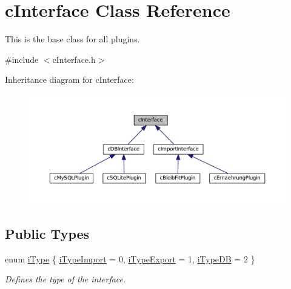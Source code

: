 \hypertarget{classc_interface}{}\section{c\+Interface Class Reference}
\label{classc_interface}


This is the base class for all plugins.  




{\ttfamily \#include $<$c\+Interface.\+h$>$}



Inheritance diagram for c\+Interface\+:
\nopagebreak
\begin{figure}[H]
\begin{center}
\leavevmode
\includegraphics[width=350pt]{classc_interface__inherit__graph}
\end{center}
\end{figure}
\subsection*{Public Types}
\begin{DoxyCompactItemize}
\item 
enum \hyperlink{classc_interface_a41462a3131755963add9ba3026e7d31a}{i\+Type} \{ \hyperlink{classc_interface_a41462a3131755963add9ba3026e7d31aa493982726026a437f9042749a76f456a}{i\+Type\+Import} = 0, 
\hyperlink{classc_interface_a41462a3131755963add9ba3026e7d31aa4b8e5dcb2c471b3fb96ea37d8263612f}{i\+Type\+Export} = 1, 
\hyperlink{classc_interface_a41462a3131755963add9ba3026e7d31aa242858255f85f84d2c9791f376bf738a}{i\+Type\+DB} = 2
 \}\begin{DoxyCompactList}\small\item\em Defines the type of the interface. \end{DoxyCompactList}
\end{DoxyCompactItemize}
